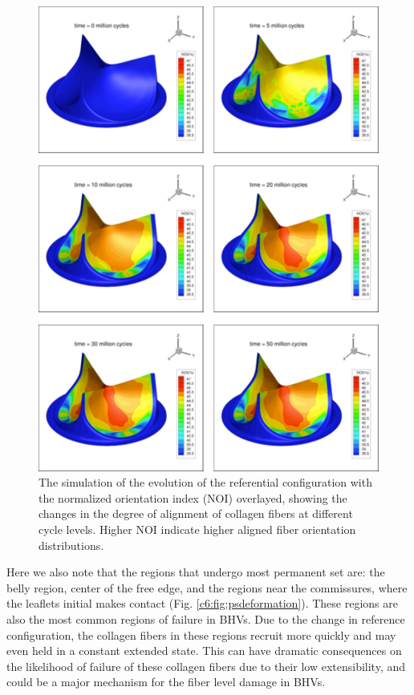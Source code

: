 \begin{figure}
\centering
\includegraphics[width=5in]{Images/chapter6/permanentsetnoi.pdf}
\caption{The simulation of the evolution of the referential configuration with the normalized orientation index (NOI) overlayed, showing the changes in the degree of alignment of collagen fibers at different cycle levels. Higher NOI indicate higher aligned fiber orientation distributions.}
\label{c6:fig:psnoi}
\end{figure}
    
    Here we also note that the regions that undergo most permanent set are: the belly region, center of the free edge, and the regions near the commissures, where the leaflets initial makes contact (Fig. \ref{c6:fig:psdeformation}). These regions are also the most common regions of failure in BHVs. Due to the change in reference configuration, the collagen fibers in these regions recruit more quickly and may even held in a constant extended state. This can have dramatic consequences on the likelihood of failure of these collagen fibers due to their low extensibility, and could be a major mechanism for the fiber level damage in BHVs. 
    
